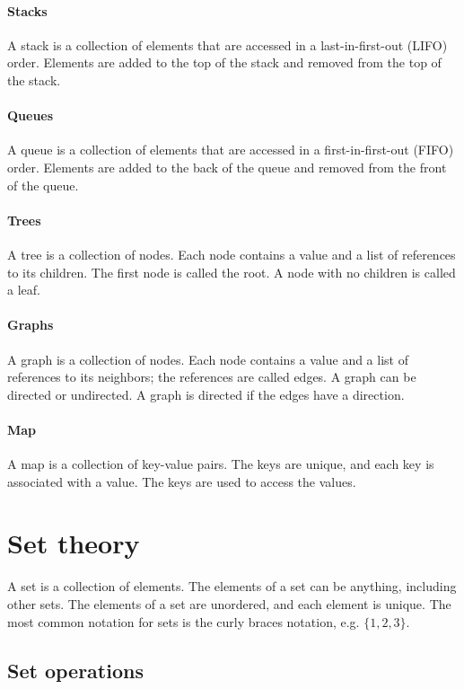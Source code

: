 \paragraph{Stacks}  A stack is a collection of elements that are accessed in a
last-in-first-out (LIFO) order.  Elements are added to the top of the stack and
removed from the top of the stack.

\paragraph{Queues}  A queue is a collection of elements that are accessed in a
first-in-first-out (FIFO) order.  Elements are added to the back of the queue and
removed from the front of the queue.

\paragraph{Trees}  A tree is a collection of nodes.  Each node contains a value and a
list of references to its children.  The first node is called the root.  A node with
no children is called a leaf.

\paragraph{Graphs}  A graph is a collection of nodes.  Each node contains a value and a
list of references to its neighbors; the references are called edges.  A graph can be
directed or undirected.  A graph is directed if the edges have a direction.

\paragraph{Map} A map is a collection of key-value pairs.  The keys are unique, and
each key is associated with a value.  The keys are used to access the values.

\section{Set theory}

A set is a collection of elements.  The elements of a set can be anything, including
other sets.  The elements of a set are unordered, and each element is unique.  The
most common notation for sets is the curly braces notation, e.g. $\{1, 2, 3\}$.

\subsection{Set operations}

